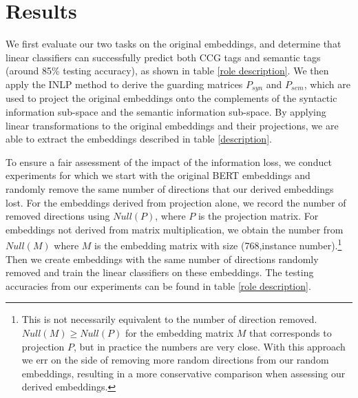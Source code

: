 \documentclass[11pt,a4paper]{article}
\begin{document}
\section{Results}
\label{sec:result}

We first evaluate our two tasks on the original embeddings, and determine that linear classifiers can successfully predict both CCG tags and semantic tags (around 85\% testing accuracy), as shown in table \ref{role description}. We then apply the INLP method to derive the guarding matrices $P_{syn}$ and $P_{sem}$, which are used to project the original embeddings onto the complements of the syntactic information sub-space and the semantic information sub-space. By applying linear transformations to the original embeddings and their projections, we are able to extract the embeddings described in table \ref{description}. 

To ensure a fair assessment of the impact of the information loss, we conduct experiments for which we start with the original BERT embeddings and randomly remove the same number of directions that our derived embeddings lost. For the embeddings derived from projection alone, we record the number of removed directions using $Null(P)$, where $P$ is the projection matrix. For embeddings not derived from matrix multiplication, we obtain the number from $Null(M)$ where $M$ is the embedding matrix with size (768,instance number).\footnote{This is not necessarily equivalent to the number of direction removed. $Null(M) \geq Null(P)$ for the embedding matrix $M$ that corresponds to projection $P$, but in practice the numbers are very close. With this approach we err on the side of removing more random directions from our random embeddings, resulting in a more conservative comparison when assessing our derived embeddings.} Then we create embeddings with the same number of directions randomly removed and train the linear classifiers on these embeddings. The testing accuracies from our experiments can be found in table \ref{role description}.
\end{document}
